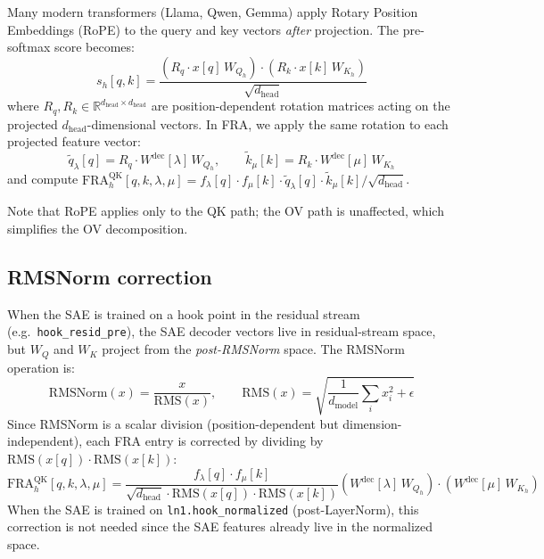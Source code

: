 \documentclass{article}
\theoremstyle{plain}
\theoremstyle{definition}
\theoremstyle{remark}
\newcommand{\Wdec}{W^{\mathrm{dec}}}
\newcommand{\WQ}{W_Q}
\newcommand{\WK}{W_K}
\newcommand{\dmodel}{d_{\mathrm{model}}}
\newcommand{\dhead}{d_{\mathrm{head}}}
\newcommand{\flambda}{f_\lambda}
\newcommand{\fmu}{f_\mu}
\newcommand{\RR}{\mathbb{R}}
\begin{document}
Many modern transformers (Llama, Qwen, Gemma) apply Rotary Position Embeddings (RoPE) to the query and key vectors \emph{after} projection. The pre-softmax score becomes:
\begin{equation}
    s_h[q,k] = \frac{\left(R_q \cdot x[q]\,W_{Q_h} \right) \cdot \left( R_k \cdot x[k]\,W_{K_h} \right)}{\sqrt{\dhead}}
\end{equation}
where $R_q, R_k \in \RR^{\dhead \times \dhead}$ are position-dependent rotation matrices acting on the projected $\dhead$-dimensional vectors. In FRA, we apply the same rotation to each projected feature vector:
\begin{equation}
    \tilde{q}_\lambda[q] = R_q \cdot \Wdec[\lambda]\,W_{Q_h}, \qquad \tilde{k}_\mu[k] = R_k \cdot \Wdec[\mu]\,W_{K_h}
\end{equation}
and compute $\mathrm{FRA}^{\mathrm{QK}}_h[q,k,\lambda,\mu] = \flambda[q] \cdot \fmu[k] \cdot \tilde{q}_\lambda[q] \cdot \tilde{k}_\mu[k] / \sqrt{\dhead}$.

Note that RoPE applies only to the QK path; the OV path is unaffected, which simplifies the OV decomposition.

\subsection{RMSNorm correction}
\label{app:rms}

When the SAE is trained on a hook point in the residual stream (e.g.\ \texttt{hook\_resid\_pre}), the SAE decoder vectors live in residual-stream space, but $\WQ$ and $\WK$ project from the \emph{post-RMSNorm} space. The RMSNorm operation is:
\begin{equation}
    \mathrm{RMSNorm}(x) = \frac{x}{\mathrm{RMS}(x)}, \qquad \mathrm{RMS}(x) = \sqrt{\frac{1}{\dmodel} \sum_i x_i^2 + \epsilon}
\end{equation}
Since RMSNorm is a scalar division (position-dependent but dimension-independent), each FRA entry is corrected by dividing by $\mathrm{RMS}(x[q]) \cdot \mathrm{RMS}(x[k])$:
\begin{equation}
    \mathrm{FRA}^{\mathrm{QK}}_h[q,k,\lambda,\mu] = \frac{\flambda[q] \cdot \fmu[k]}{\sqrt{\dhead} \cdot \mathrm{RMS}(x[q]) \cdot \mathrm{RMS}(x[k])} \left( \Wdec[\lambda]\,W_{Q_h} \right) \cdot \left( \Wdec[\mu]\,W_{K_h} \right)
\end{equation}
When the SAE is trained on \texttt{ln1.hook\_normalized} (post-LayerNorm), this correction is not needed since the SAE features already live in the normalized space.
\end{document}
